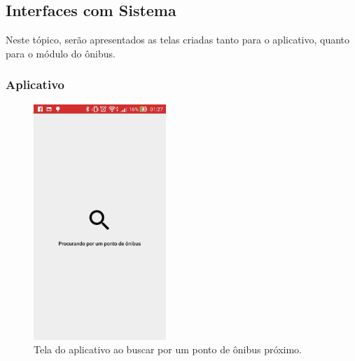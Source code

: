 \documentclass[
	12pt,				%
	oneside,			%
	a4paper,			%
	brazil				%
]{abntex2}
\begin{document}
\newpage

\subsection{Interfaces com Sistema}

Neste tópico, serão apresentados as telas criadas tanto para o aplicativo, quanto para o módulo do ônibus.

\subsubsection{Aplicativo}


\begin{figure}[H]
\centering
\includegraphics[width=5cm, center]{images/beacon_searching_bus_stop}
\caption{Tela do aplicativo ao buscar por um ponto de ônibus próximo.}
\label{Rotulo}
\end{figure}
\end{document}
